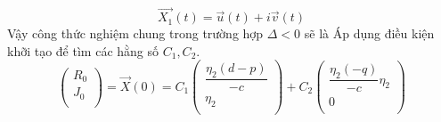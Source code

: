 \documentclass[a4paper]{article}
\begin{document}
    \begin{equation*}
        \vec{X_1}(t)=\vec{u}(t) + i\vec{v}(t)
    \end{equation*}
    Vậy công thức nghiệm chung trong trường hợp $\Delta < 0$ sẽ là
    \newline
    \newline
    \newline
    \newline
    Áp dụng điều kiện khỡi tạo để tìm các hằng số $C_1, C_2$.
    \begin{equation*}
        \begin{pmatrix}
            R_0 \\
            J_0 \\
        \end{pmatrix}
        =
        \vec{X}(0)
        =
            {C_1}
            \begin{pmatrix}
                \dfrac{\eta_2 (d - p)}{-c} \\
                \eta_2 \\
            \end{pmatrix}
        +
            {C_2}
            \begin{pmatrix}
                \dfrac{\eta_2 (-q)}{-c}\eta_2 \\
                0 \\
            \end{pmatrix}
    \end{equation*}
    \begin{center}
    \end{center}
\end{document}
